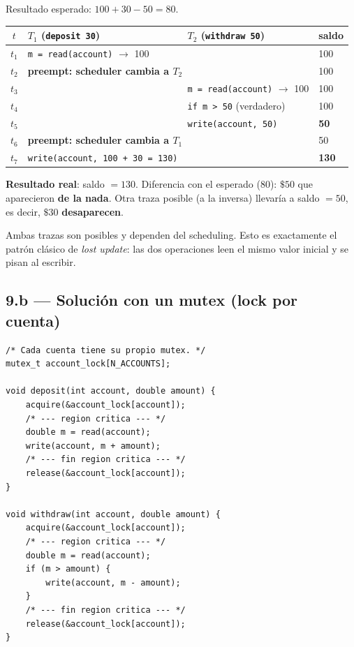 \documentclass[11pt,a4paper]{article}
\begin{document}
Resultado esperado: $100 + 30 - 50 = 80$.

\begin{center}
\small
\begin{tabular}{@{}clll@{}}
\toprule
$t$ & $T_1$ (\texttt{deposit 30})                & $T_2$ (\texttt{withdraw 50}) & saldo \\
\midrule
$t_1$ & \texttt{m = read(account)} $\to$ 100      &                                   & 100 \\
$t_2$ & \multicolumn{2}{l}{\textbf{preempt: scheduler cambia a $T_2$}}                & 100 \\
$t_3$ &                                            & \texttt{m = read(account)} $\to$ 100 & 100 \\
$t_4$ &                                            & \texttt{if m > 50} (verdadero)        & 100 \\
$t_5$ &                                            & \texttt{write(account, 50)}            & \textbf{50} \\
$t_6$ & \multicolumn{2}{l}{\textbf{preempt: scheduler cambia a $T_1$}}                & 50 \\
$t_7$ & \texttt{write(account, 100 + 30 = 130)}    &                                   & \textbf{130} \\
\bottomrule
\end{tabular}
\end{center}

\textbf{Resultado real}: saldo $= 130$. Diferencia con el esperado
($80$): $\$50$ que aparecieron \textbf{de la nada}. Otra traza
posible (a la inversa) llevaría a saldo $= 50$, es decir, $\$30$
\textbf{desaparecen}.

Ambas trazas son posibles y dependen del scheduling. Esto es
exactamente el patrón clásico de \emph{lost update}: las dos
operaciones leen el mismo valor inicial y se pisan al escribir.

\subsection*{9.b --- Solución con un mutex (lock por cuenta)}

\begin{lstlisting}[style=cstyle]
/* Cada cuenta tiene su propio mutex. */
mutex_t account_lock[N_ACCOUNTS];

void deposit(int account, double amount) {
    acquire(&account_lock[account]);
    /* --- region critica --- */
    double m = read(account);
    write(account, m + amount);
    /* --- fin region critica --- */
    release(&account_lock[account]);
}

void withdraw(int account, double amount) {
    acquire(&account_lock[account]);
    /* --- region critica --- */
    double m = read(account);
    if (m > amount) {
        write(account, m - amount);
    }
    /* --- fin region critica --- */
    release(&account_lock[account]);
}
\end{lstlisting}
\end{document}
